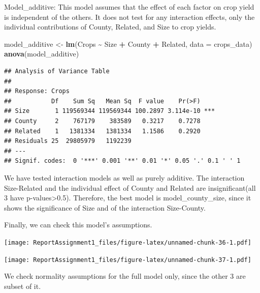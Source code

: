 \documentclass[
  11pt,
]{article}
\newenvironment{Shaded}{\begin{snugshade}}{\end{snugshade}}
\newcommand{\AttributeTok}[1]{\textcolor[rgb]{0.13,0.29,0.53}{#1}}
\newcommand{\DecValTok}[1]{\textcolor[rgb]{0.00,0.00,0.81}{#1}}
\newcommand{\FunctionTok}[1]{\textcolor[rgb]{0.13,0.29,0.53}{\textbf{#1}}}
\newcommand{\NormalTok}[1]{#1}
\newcommand{\OtherTok}[1]{\textcolor[rgb]{0.56,0.35,0.01}{#1}}
\newcommand{\SpecialCharTok}[1]{\textcolor[rgb]{0.81,0.36,0.00}{\textbf{#1}}}
\begin{document}
Model\_additive: This model assumes that the effect of each factor on
crop yield is independent of the others. It does not test for any
interaction effects, only the individual contributions of County,
Related, and Size to crop yields.

\begin{Shaded}
\begin{Highlighting}[]
\NormalTok{model\_additive }\OtherTok{\textless{}{-}} \FunctionTok{lm}\NormalTok{(Crops }\SpecialCharTok{\textasciitilde{}}\NormalTok{ Size }\SpecialCharTok{+}\NormalTok{ County }\SpecialCharTok{+}\NormalTok{ Related, }\AttributeTok{data =}\NormalTok{ crops\_data)}
\FunctionTok{anova}\NormalTok{(model\_additive)}
\end{Highlighting}
\end{Shaded}

\begin{verbatim}
## Analysis of Variance Table
## 
## Response: Crops
##           Df    Sum Sq   Mean Sq  F value    Pr(>F)    
## Size       1 119569344 119569344 100.2897 3.114e-10 ***
## County     2    767179    383589   0.3217    0.7278    
## Related    1   1381334   1381334   1.1586    0.2920    
## Residuals 25  29805979   1192239                       
## ---
## Signif. codes:  0 '***' 0.001 '**' 0.01 '*' 0.05 '.' 0.1 ' ' 1
\end{verbatim}

We have tested interaction models as well as purely additive. The
interaction Size-Related and the individual effect of County and Related
are insignificant(all 3 have p-values\textgreater0.5). Therefore, the
best model is model\_county\_size, since it shows the significance of
Size and of the interaction Size-County.

Finally, we can check this model's assumptions.

\texttt{[image: ReportAssignment1\_files/figure-latex/unnamed-chunk-36-1.pdf]}

\texttt{[image: ReportAssignment1\_files/figure-latex/unnamed-chunk-37-1.pdf]}

We check normality assumptions for the full model only, since the other
3 are subset of it.

\begin{Shaded}
\end{Shaded}
\end{document}
